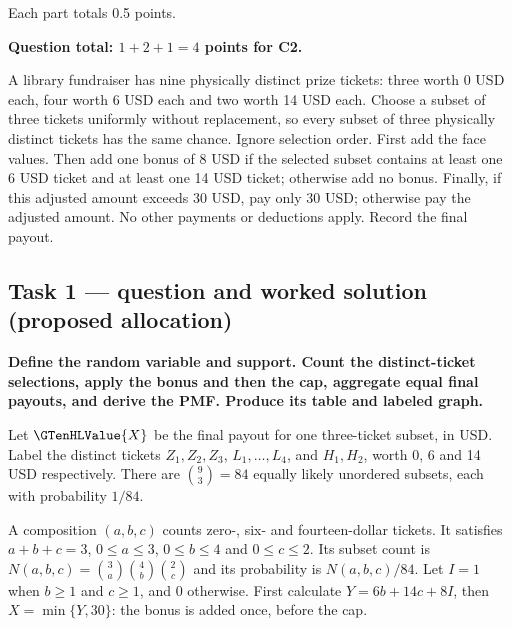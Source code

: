 Each part totals 0.5 points.

\par\vspace{3mm}\secInicio[][sec:q5]

\textbf{Question total: $1+2+1=4$ points for C2.}

\clearpage
{}

A library fundraiser has nine physically distinct prize tickets: three worth 0 USD each, four worth 6 USD each and two worth 14 USD each. Choose a subset of three tickets uniformly without replacement, so every subset of three physically distinct tickets has the same chance. Ignore selection order. First add the face values. Then add one bonus of 8 USD if the selected subset contains at least one 6 USD ticket and at least one 14 USD ticket; otherwise add no bonus. Finally, if this adjusted amount exceeds 30 USD, pay only 30 USD; otherwise pay the adjusted amount. No other payments or deductions apply. Record the final payout.

\subsection*{Task 1 --- question and worked solution (proposed allocation) }
\label{sol:q6t1}

\noindent\textbf{\boldmath Define the random variable and support. Count the distinct-ticket selections, apply the bonus and then the cap, aggregate equal final payouts, and derive the PMF. Produce its table and labeled graph.}\par\nopagebreak

Let $\GTenHLValue{X}$ be the final payout for one three-ticket subset, in USD. Label the distinct tickets $Z_1,Z_2,Z_3$, $L_1,\ldots,L_4$, and $H_1,H_2$, worth 0, 6 and 14 USD respectively. There are $\binom93=84$ equally likely unordered subsets, each with probability $1/84$.

A composition $(a,b,c)$ counts zero-, six- and fourteen-dollar tickets. It satisfies $a+b+c=3$, $0\leq a\leq3$, $0\leq b\leq4$ and $0\leq c\leq2$. Its subset count is $N(a,b,c)=\binom3a\binom4b\binom2c$ and its probability is $N(a,b,c)/84$. Let $I=1$ when $b\geq1$ and $c\geq1$, and 0 otherwise. First calculate $Y=6b+14c+8I$, then $X=\min\{Y,30\}$: the bonus is added once, before the cap.
\begingroup\renewcommand{\arraystretch}{1.35}

